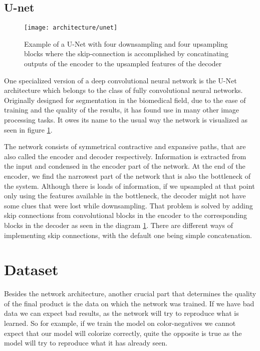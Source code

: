 \subsection{U-net}

\begin{figure}[!h]
	\centering
	\texttt{[image: architecture/unet]}
    \caption{Example of a U-Net with four downsampling and four upsampling blocks 
	where the skip-connection is accomplished by concatinating outputs of the 
	encoder to the upsampled features of the decoder}
	\label{fig:unet}
\end{figure}

One specialized version of a deep convolutional neural network is the U-Net 
architecture which belongs to the class of fully convolutional neural networks. 
Originally designed for segmentation in the biomedical field, due to the ease
of training and the quality of the results, it has found use in many other 
image processing tasks. It owes its name to the usual way the network is 
visualized as seen in figure \ref{fig:unet}.

The network consists of symmetrical contractive and expansive paths, that are also
called the encoder and decoder respectively. Information is extracted from
the input and condensed in the encoder part of the network. At the end of the 
encoder, we find the narrowest part of the network that is also the bottleneck 
of the system. Although there is loads of information, if we upsampled at that 
point only using the features available in the bottleneck, the decoder might
not have some clues that were lost while downsampling. That problem is 
solved by adding skip connections from convolutional blocks in the encoder to
the corresponding blocks in the decoder as seen in the diagram \ref{fig:unet}. 
There are different ways of implementing skip connections, with the default one
being simple concatenation. 

\section{Dataset}
\label{sec:dataset}

Besides the network architecture, another crucial part that determines the quality
of the final product is the data on which the network was trained. If we have bad
data we can expect bad results, as the network will try to reproduce what is learned.
So for example, if we train the model on color-negatives we cannot expect that 
our model will colorize correctly, quite the opposite is true as the model will
try to reproduce what it has already seen. 

